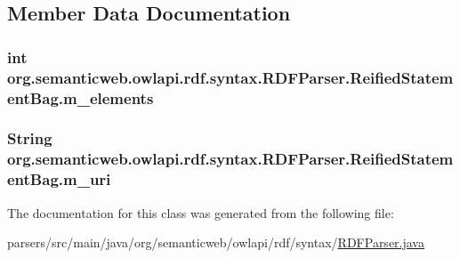 \subsection{Member Data Documentation}
\hypertarget{classorg_1_1semanticweb_1_1owlapi_1_1rdf_1_1syntax_1_1_r_d_f_parser_1_1_reified_statement_bag_ac1bd222ecf85eb03c582208f49e7fb84}{
\subsubsection[{m\-\_\-elements}]{\setlength{\rightskip}{0pt plus 5cm}int org.\-semanticweb.\-owlapi.\-rdf.\-syntax.\-R\-D\-F\-Parser.\-Reified\-Statement\-Bag.\-m\-\_\-elements\hspace{0.3cm}{\ttfamily [protected]}}}\label{classorg_1_1semanticweb_1_1owlapi_1_1rdf_1_1syntax_1_1_r_d_f_parser_1_1_reified_statement_bag_ac1bd222ecf85eb03c582208f49e7fb84}
\hypertarget{classorg_1_1semanticweb_1_1owlapi_1_1rdf_1_1syntax_1_1_r_d_f_parser_1_1_reified_statement_bag_adb7347d2ad7c449a9220abe424344300}{
\subsubsection[{m\-\_\-uri}]{\setlength{\rightskip}{0pt plus 5cm}String org.\-semanticweb.\-owlapi.\-rdf.\-syntax.\-R\-D\-F\-Parser.\-Reified\-Statement\-Bag.\-m\-\_\-uri\hspace{0.3cm}{\ttfamily [protected]}}}\label{classorg_1_1semanticweb_1_1owlapi_1_1rdf_1_1syntax_1_1_r_d_f_parser_1_1_reified_statement_bag_adb7347d2ad7c449a9220abe424344300}


The documentation for this class was generated from the following file\-:\begin{DoxyCompactItemize}
\item 
parsers/src/main/java/org/semanticweb/owlapi/rdf/syntax/\hyperlink{_r_d_f_parser_8java}{R\-D\-F\-Parser.\-java}\end{DoxyCompactItemize}
